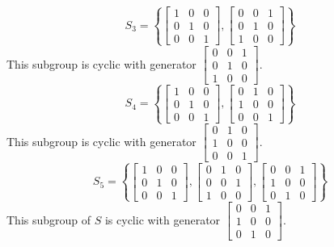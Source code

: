 \documentclass{scrartcl}
\begin{document}
\begin{displaymath}
S_3=\left \{
\begin{bmatrix}
1 & 0 & 0 \\
0 & 1 & 0 \\
0 & 0 & 1 
\end{bmatrix},\begin{bmatrix}
0 & 0 & 1 \\
0 & 1 & 0 \\
1 & 0 & 0 
\end{bmatrix}
\right \}
\end{displaymath}
This subgroup is cyclic with generator $\begin{bmatrix}
0 & 0 & 1 \\
0 & 1 & 0 \\
1 & 0 & 0 
\end{bmatrix}$.\\

\begin{displaymath}
S_4=\left \{
\begin{bmatrix}
1 & 0 & 0 \\ 0 & 1 & 0 \\ 0 & 0 & 1
\end{bmatrix},\begin{bmatrix}
0 & 1 & 0 \\ 1 & 0 & 0 \\ 0 & 0 & 1
\end{bmatrix}
\right \}
\end{displaymath}
This subgroup is cyclic with generator $\begin{bmatrix}
0 & 1 & 0 \\
1 & 0 & 0 \\
0 & 0 & 1 
\end{bmatrix}$.\\
\begin{displaymath}
S_5=\left \{
\begin{bmatrix}
1 & 0 & 0 \\
0 & 1 & 0 \\
0 & 0 & 1
\end{bmatrix},\begin{bmatrix}
0 & 1 & 0 \\
0 & 0 & 1 \\
1 & 0 & 0
\end{bmatrix},\begin{bmatrix}
0 & 0 & 1 \\
1 & 0 & 0 \\
0 & 1 & 0
\end{bmatrix}
\right \}
\end{displaymath}
This subgroup of $S$ is cyclic with generator $\begin{bmatrix}
0 & 0 & 1 \\
1 & 0 & 0 \\
0 & 1 & 0
\end{bmatrix}$.\\
\end{document}
